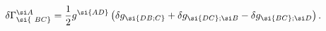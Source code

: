 \begin{equation}
\delta \Gamma^{\si A}_{\si{\ BC}} = \frac{1}{2} g^{\si{AD}} \left(
\delta g_{\si{DB;C}} + \delta g_{\si{DC};{\si B}} - \delta
g_{\si{BC};{\si D}} \right).
\end{equation}


